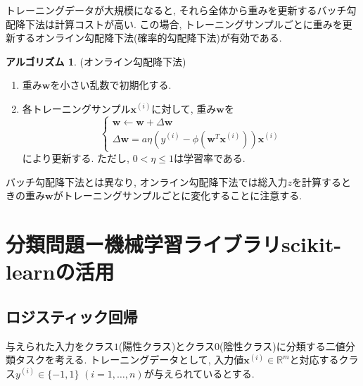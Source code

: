 \documentclass[uplatex]{jsarticle}
\theoremstyle{definition}
\newtheorem{algorithm}[definition]{アルゴリズム}
\numberwithin{equation}{section}
\newcommand{\R}{\mathbb{R}}
\begin{document}
トレーニングデータが大規模になると, それら全体から重みを更新するバッチ勾配降下法は計算コストが高い.
この場合, トレーニングサンプルごとに重みを更新するオンライン勾配降下法(確率的勾配降下法)が有効である.
\begin{algorithm}
    (オンライン勾配降下法)
    \begin{enumerate}
        \item
        重み$\bm{w}$を小さい乱数で初期化する.
        \item
        各トレーニングサンプル$\bm{x}^{(i)}$に対して, 重み$\bm{w}$を
        \begin{equation}
            \begin{cases}
                \bm{w} \leftarrow \bm{w} + \Delta\bm{w} \\
                \Delta\bm{w} = a\eta(y^{(i)} - \phi(\bm{w}^{T}\bm{x}^{(i)}))\bm{x}^{(i)}
            \end{cases}
        \end{equation}
        により更新する.
        ただし, $0 < \eta \leq 1$は学習率である.
    \end{enumerate}
\end{algorithm}
バッチ勾配降下法とは異なり, オンライン勾配降下法では総入力$z$を計算するときの重み$\bm{w}$がトレーニングサンプルごとに変化することに注意する.


\section{分類問題ー機械学習ライブラリscikit-learnの活用}
\subsection{ロジスティック回帰}
与えられた入力をクラス$1$(陽性クラス)とクラス$0$(陰性クラス)に分類する二値分類タスクを考える.
トレーニングデータとして, 入力値$\bm{x}^{(i)} \in \R^{m}$と対応するクラス$y^{(i)} \in \{-1, 1\}$ $(i = 1, \dots, n)$が与えられているとする.
\end{document}

